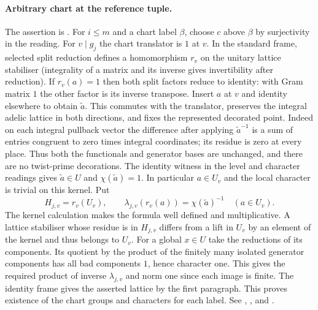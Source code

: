 \paragraph{Arbitrary chart at the reference tuple.}
The assertion is .
For $i\le m$ and a chart label $\beta$, choose $c$ above $\beta$ by
surjectivity in the reading. For $v\mid g_j$ the chart translator is
$1$ at $v$. In the standard frame, selected split reduction defines a
homomorphism $r_v$ on the unitary lattice stabiliser (integrality of a
matrix and its inverse gives invertibility after reduction). If
$r_v(a)=1$ then both split factors reduce to identity: with Gram matrix
$1$ the other factor is its inverse transpose. Insert $a$ at $v$ and
identity elsewhere to obtain $\widetilde a$. This commutes with the
translator, preserves the integral adelic lattice in both directions,
and fixes the represented decorated point. Indeed on each integral
pullback vector the difference after applying $\widetilde a^{-1}$ is
a sum of entries congruent to zero times integral coordinates; its
residue is zero at every place. Thus both the functionals and generator
bases are unchanged, and there are no twist-prime decorations. The
identity witness in the level and character readings gives
$\widetilde a\in U$ and $\chi(\widetilde a)=1$.
In particular $a\in U_v$ and the local character is trivial on this
kernel. Put
\[
 H_{j,v}=r_v(U_v),\qquad
 \lambda_{j,v}(r_v(a))=\chi(\widetilde a)^{-1}\quad(a\in U_v).
\]
The kernel calculation makes the formula well defined and multiplicative.
A lattice stabiliser whose residue is in $H_{j,v}$ differs from a lift
in $U_v$ by an element of the kernel and thus belongs to $U_v$. For a
global $x\in U$ take the reductions of its components. Its quotient by
the product of the finitely many isolated generator components has all
bad components $1$, hence character one. This gives the required product
of inverse $\lambda_{j,v}$ and norm one since each image is finite.
The identity frame gives the asserted lattice by the first paragraph.
This proves existence of the chart groups and characters for each label.
See , ,
 and .

